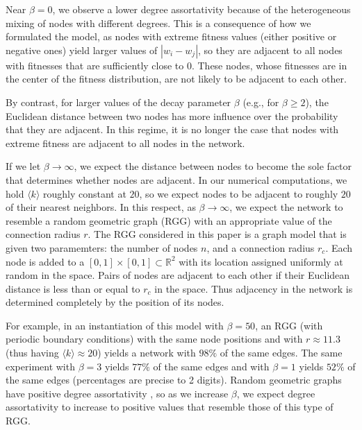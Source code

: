 \documentclass[%
 reprint,
 amsmath,amssymb,
 aps,
]{revtex4-1}
\begin{document}
Near $\beta = 0$, we observe a lower degree assortativity because of the heterogeneous mixing of nodes with different degrees. This is a consequence of how we formulated the model, as nodes with extreme fitness values (either positive or negative ones) yield larger values of $|w_i - w_j|$, so they are adjacent to all nodes with fitnesses that are sufficiently close to $0$. These nodes, whose fitnesses are in the center of the fitness distribution, are not likely to be adjacent to each other.

By contrast, for larger values of the decay parameter $\beta$ (e.g., for $\beta \geq 2$), the Euclidean distance between two nodes has more influence over the probability that they are adjacent. In this regime, it is no longer the case that nodes with extreme fitness are adjacent to all nodes in the network. 

If we let $\beta \rightarrow \infty$, we expect the distance between nodes to become the sole factor that determines whether nodes are adjacent. In our numerical computations, we hold $\langle k \rangle$ roughly constant at $20$, so we expect nodes to be adjacent to roughly $20$ of their nearest neighbors. In this respect, as $\beta \rightarrow \infty$, we expect the network to resemble a random geometric graph (RGG) \cite{penrose-rgg, rgg} with an appropriate value of the connection radius $r$. {\color{red}The RGG considered in this paper is a graph model that is given two paramemters: the number of nodes $n$, and a connection radius $r_c$. Each node is added to a $[0, 1] \times [0, 1] \subset \mathbb{R}^2$ with its location assigned uniformly at random in the space. Pairs of nodes are adjacent to each other if their Euclidean distance is less than or equal to $r_c$ in the space. Thus adjacency in the network is determined completely by the position of its nodes. }

For example, in an instantiation of this model with $\beta=50$, an RGG (with periodic boundary conditions) with the same node positions and with $r \approx 11.3$ (thus having $\langle k \rangle \approx 20$) yields a network with $98\%$ of the same edges. {\color{red}The same experiment with $\beta=3$ yields $77\%$ of the same edges and with $\beta=1$ yields $52\%$ of the same edges (percentages are precise to 2 digits).} Random geometric graphs have positive degree assortativity \cite{rgg_correlations}, so as we increase $\beta$, we expect degree assortativity to increase to positive values that resemble those of this type of RGG.

\end{document}
